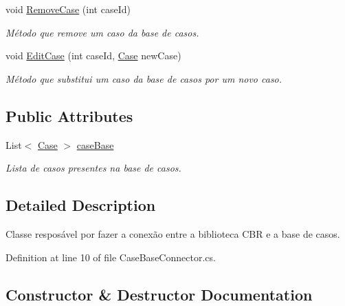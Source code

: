 \begin{DoxyCompactItemize}
void \hyperlink{class_case_base_connector_a1a85907a149e2bb4e3c198936e6f59d3}{Remove\+Case} (int case\+Id)
\begin{DoxyCompactList}\small\item\em Método que remove um caso da base de casos. \end{DoxyCompactList}\item 
void \hyperlink{class_case_base_connector_afc9618b6b8f22f9184e59a86086be239}{Edit\+Case} (int case\+Id, \hyperlink{class_case}{Case} new\+Case)
\begin{DoxyCompactList}\small\item\em Método que substitui um caso da base de casos por um novo caso. \end{DoxyCompactList}\end{DoxyCompactItemize}
\subsection*{Public Attributes}
\begin{DoxyCompactItemize}
\item 
List$<$ \hyperlink{class_case}{Case} $>$ \hyperlink{class_case_base_connector_afbbc563b42797bf19f8790f40e34425a}{case\+Base}
\begin{DoxyCompactList}\small\item\em Lista de casos presentes na base de casos. \end{DoxyCompactList}\end{DoxyCompactItemize}


\subsection{Detailed Description}
Classe resposável por fazer a conexão entre a biblioteca C\+BR e a base de casos. 



Definition at line 10 of file Case\+Base\+Connector.\+cs.



\subsection{Constructor \& Destructor Documentation}
\hypertarget{class_case_base_connector_adb41d690fb4a06168c15b3b750c0cda2}{}\label{class_case_base_connector_adb41d690fb4a06168c15b3b750c0cda2} 
